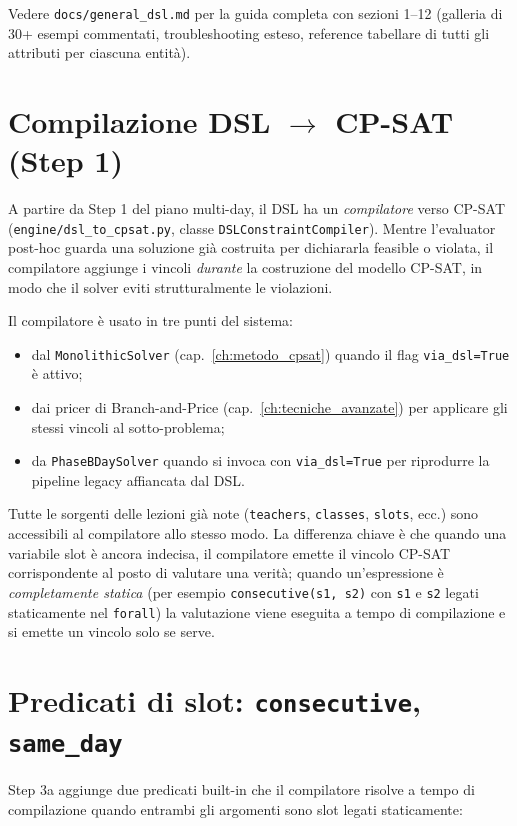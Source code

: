 Vedere \texttt{docs/general\_dsl.md} per la guida completa con
sezioni 1--12 (galleria di 30+ esempi commentati,
troubleshooting esteso, reference tabellare di tutti gli
attributi per ciascuna entit\`a).

\section{Compilazione DSL $\to$ CP-SAT (Step 1)}
\label{sec:dsl-cpsat}

A partire da Step 1 del piano multi-day, il DSL ha un
\emph{compilatore} verso CP-SAT
(\texttt{engine/dsl\_to\_cpsat.py}, classe
\texttt{DSLConstraintCompiler}). Mentre l'evaluator post-hoc
guarda una soluzione gi\`a costruita per dichiararla feasible o
violata, il compilatore aggiunge i vincoli \emph{durante} la
costruzione del modello CP-SAT, in modo che il solver eviti
strutturalmente le violazioni.

Il compilatore \`e usato in tre punti del sistema:
\begin{itemize}
\item dal \texttt{MonolithicSolver} (cap.~\ref{ch:metodo_cpsat})
  quando il flag \texttt{via\_dsl=True} \`e attivo;
\item dai pricer di Branch-and-Price
  (cap.~\ref{ch:tecniche_avanzate}) per applicare gli stessi
  vincoli al sotto-problema;
\item da \texttt{PhaseBDaySolver} quando si invoca con
  \texttt{via\_dsl=True} per riprodurre la pipeline legacy
  affiancata dal DSL.
\end{itemize}

Tutte le sorgenti delle lezioni gi\`a note (\texttt{teachers},
\texttt{classes}, \texttt{slots}, ecc.) sono accessibili al
compilatore allo stesso modo. La differenza chiave \`e che
quando una variabile slot \`e ancora indecisa, il compilatore
emette il vincolo CP-SAT corrispondente al posto di valutare
una verit\`a; quando un'espressione \`e \emph{completamente
statica} (per esempio \texttt{consecutive(s1, s2)} con \texttt{s1}
e \texttt{s2} legati staticamente nel \texttt{forall}) la
valutazione viene eseguita a tempo di compilazione e si emette
un vincolo solo se serve.

\section{Predicati di slot: \texttt{consecutive}, \texttt{same\_day}}
\label{sec:dsl-slot-preds}

Step 3a aggiunge due predicati built-in che il compilatore
risolve a tempo di compilazione quando entrambi gli argomenti
sono slot legati staticamente:

